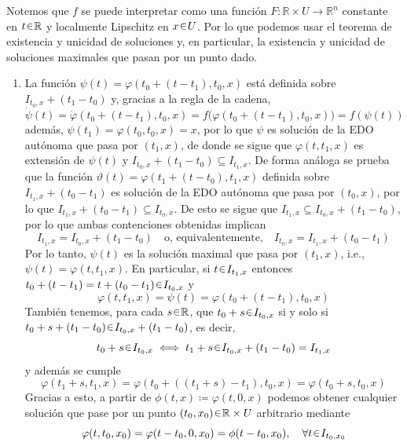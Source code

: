 \begin{sol}
Notemos que $f$ se puede interpretar como una función $F \colon \mathbb{R} \times U \to \mathbb{R}^n$ constante en $t \en \mathbb{R}$ y localmente Lipschitz en $x \en U$. Por lo que podemos usar el teorema de existencia y unicidad de soluciones y, en particular, la existencia y unicidad de soluciones maximales que pasan por un punto dado. 
\begin{enumerate}[label = (\alph*)]
\item La función $\psi(t) = \varphi(t_0 + (t - t_1),t_0,x)$ está definida sobre $I_{t_0,x}+(t_1-t_0)$ y, gracias a la regla de la cadena, 
\[
\dot\psi(t) = \dot\varphi(t_0 + (t - t_1),t_0,x) = f\big(\varphi(t_0 + (t - t_1),t_0,x)\big) = f(\psi(t))
\]
además, $\psi(t_1) = \varphi(t_0,t_0,x) = x$, por lo que $\psi$ es solución de la EDO autónoma que pasa por $(t_1,x)$, de donde se sigue que $\varphi(t,t_1,x)$ es extensión de $\psi(t)$ y $I_{t_0,x} + (t_1 - t_0) \subseteq I_{t_1,x}$. De forma análoga se prueba que la función $\vartheta(t) = \varphi(t_1+(t-t_0),t_1,x)$ definida sobre $I_{t_1,x} + (t_0-t_1)$ es solución de la EDO autónoma que pasa por $(t_0,x)$, por lo que $I_{t_1,x} + (t_0 - t_1) \subseteq I_{t_0,x}$. De esto se sigue que $I_{t_1,x} \subseteq I_{t_0,x} + (t_1 - t_0)$, por lo que ambas contenciones obtenidas implican 
\[
I_{t_1,x} = I_{t_0,x} + (t_1 - t_0)%
\quad\text{o, equivalentemente,}\quad%
I_{t_0,x} = I_{t_1,x} + (t_0 - t_1) 
\]
Por lo tanto, $\psi(t)$ es la solución maximal que pasa por $(t_1,x)$, i.e., $\psi(t) = \varphi(t,t_1,x)$.
En particular, si $t \en I_{t_1,x}$ entonces $t_0 + (t - t_1) = t + (t_0 - t_1) \en I_{t_0,x}$ y  
\[
\varphi(t,t_1,x) = \psi(t) = \varphi(t_0+(t-t_1),t_0,x)
\]
También tenemos, para cada $s \en \mathbb{R}$, que $t_0 + s \en I_{t_0,x}$ si y solo si $t_0+s+(t_1-t_0) \en I_{t_0,x} + (t_1 - t_0)$, es decir,
\[
t_0+s \en I_{t_0,x} \iff t_1 + s \en I_{t_0,x} + (t_1-t_0)= I_{t_1,x}
\]
y además se cumple
\[
\varphi(t_1+s,t_1,x) = \varphi(t_0 + ((t_1 + s) - t_1),t_0,x) = \varphi(t_0 + s,t_0,x)
\]
Gracias a esto, a partir de $\phi(t,x) \coloneq \varphi(t,0,x)$ podemos obtener cualquier solución que pase por un punto $(t_0,x_0) \en \mathbb{R} \times U$ arbitrario mediante
\[
\varphi(t,t_0,x_0) = \varphi(t - t_0,0,x_0) = \phi(t-t_0,x_0),%
\quad\forall t \en I_{t_0,x_0}
\]


\end{enumerate}
\end{sol}
